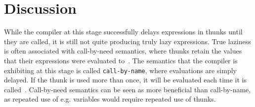 \section{Discussion} 
While the compiler at this stage successfully delays expressions in thunks
until they are called, it is still not quite producing truly lazy expressions.
True laziness is often associated with call-by-need semantics, where thunks
retain the values that their expressions were evaluated to~\cite{pltbook}. 
The semantics that
the compiler is exhibiting at this stage is called \texttt{call-by-name}, where
evaluations are simply delayed. If the thunk is used more than once, it will
be evaluated each time it is called~\cite{DragonBook}.
Call-by-need semantics can be seen as more beneficial than call-by-name, as
repeated use of e.g. variables would require repeated use of thunks.

